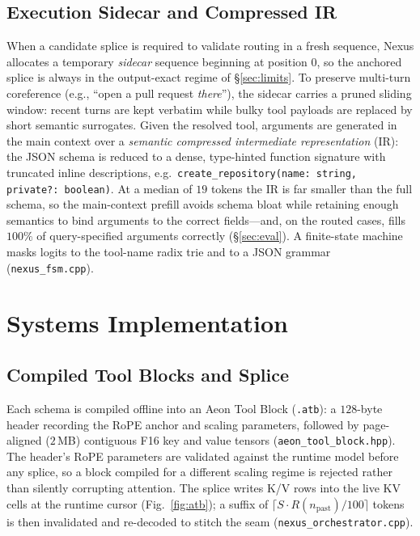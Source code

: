\documentclass[10pt,conference]{IEEEtran}
\newcommand{\code}[1]{\texttt{\small #1}}
\begin{document}
\subsection{Execution Sidecar and Compressed IR}
When a candidate splice is required to validate routing in a fresh sequence, Nexus allocates a
temporary \emph{sidecar} sequence beginning at position $0$, so the anchored splice is always in
the output-exact regime of \S\ref{sec:limits}. To preserve multi-turn coreference (e.g., ``open a
pull request \emph{there}''), the sidecar carries a pruned sliding window: recent turns are kept
verbatim while bulky tool payloads are replaced by short semantic surrogates. Given the resolved
tool, arguments are generated in the main context over a \emph{semantic compressed intermediate
representation} (IR): the JSON
schema is reduced to a dense, type-hinted function signature with truncated inline descriptions,
e.g.\ \code{create\_repository(name: string, private?: boolean)}. At a median of $19$ tokens the IR
is far smaller than the full schema, so the main-context prefill avoids schema bloat while
retaining enough semantics to bind arguments to the correct fields---and, on the routed cases,
fills $100\%$ of query-specified arguments correctly (\S\ref{sec:eval}). A finite-state machine
masks logits to the tool-name radix trie and to a JSON grammar (\code{nexus\_fsm.cpp}).

\section{Systems Implementation}
\label{sec:systems}
\subsection{Compiled Tool Blocks and Splice}
Each schema is compiled offline into an Aeon Tool Block (\code{.atb}): a $128$-byte header
recording the RoPE anchor and scaling parameters, followed by page-aligned ($2$\,MB) contiguous
F16 key and value tensors (\code{aeon\_tool\_block.hpp}). The header's RoPE parameters are validated
against the runtime model before any splice, so a block compiled for a different scaling regime is
rejected rather than silently corrupting attention. The splice writes K/V rows into the live KV
cells at the runtime cursor (Fig.~\ref{fig:atb}); a suffix of $\lceil S\cdot
R(n_{\mathrm{past}})/100\rceil$ tokens is then invalidated and re-decoded to stitch the seam
(\code{nexus\_orchestrator.cpp}).
\end{document}
